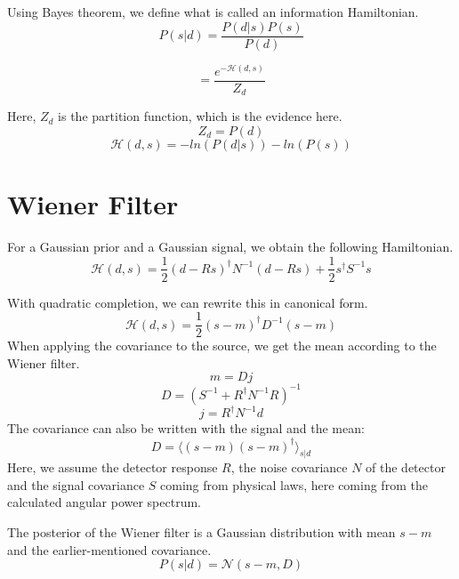 Using Bayes theorem, we define what is called an information Hamiltonian.
\begin{equation}
    P(s|d) = \frac{P(d|s)P(s)}{P(d)}
\end{equation}
    
\begin{equation}
    = \frac{e^{-\mathcal{H}(d, s)}}{Z_d}
\end{equation}

Here, $Z_d$ is the partition function, which is the evidence here.
\begin{equation}
    Z_d = P(d)
\end{equation}
\begin{equation}
        \mathcal{H}(d, s) = -ln(P(d|s)) - ln(P(s))
\end{equation}

\section{Wiener Filter}
For a Gaussian prior and a Gaussian signal, we obtain the following
Hamiltonian.
\begin{equation}
    \mathcal{H}(d, s) = \frac{1}{2}(d-Rs)^{\dagger}N^{-1}(d-Rs)+\frac{1}{2}s^{\dagger}S^{-1}s
\end{equation}

With quadratic completion, we can rewrite this in canonical form.
\begin{equation}
    \mathcal{H}(d, s) = \frac{1}{2}(s-m)^\dagger D^{-1}(s-m)
\end{equation}
When applying the covariance to the source, we get the mean according to the Wiener filter.
\begin{equation}
    m = Dj
\end{equation}
\begin{equation}
    D =(S^{-1}+R^{\dagger}N^{-1}R)^{-1}
\end{equation}
\begin{equation}
    j =R^{\dagger}N^{-1}d
\end{equation}
The covariance can also be written with the signal and the mean:
\begin{equation}
    D=\langle (s-m)(s-m)^\dagger \rangle_{s|d}
\end{equation}
Here, we assume the detector response $R$, the noise covariance $N$ of the detector and the signal covariance $S$ coming from physical laws, here coming from the calculated angular power spectrum.

The posterior of the Wiener filter is a Gaussian distribution with mean $s-m$ and the earlier-mentioned covariance.
\begin{equation}
    P(s|d)=\mathcal{N}(s-m, D)
\end{equation}


